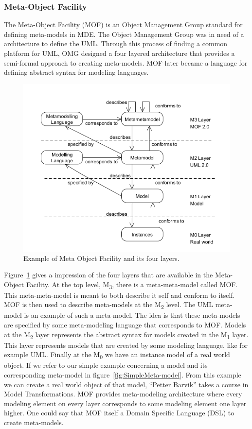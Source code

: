 \subsubsection*{Meta-Object Facility}

The Meta-Object Facility\cite{MOF} (MOF) is an Object Management Group standard
for defining meta-models in MDE. The Object Management Group was in need of a
architecture to define the UML. Through this process of finding a common
platform for UML, OMG designed a four layered architecture that provides a
semi-formal approach to creating meta-models. MOF later became a language for
defining abstract syntax for modeling languages. 

\begin{figure}[H]
	\centering
	\includegraphics[scale=0.6]{./Figures/MOFLayers.png}
	\caption[Meta Object Facility]
	{Example of Meta Object Facility and its four layers.}
	\label{fig:MOFLayers}
\end{figure}

Figure~\ref{fig:MOFLayers} gives a impression of the four layers that are
available in the Meta-Object Facility. At the top level, M\textsubscript{3},
there is a meta-meta-model called MOF. This meta-meta-model is meant to both
describe it self and conform to itself. MOF is then used to describe meta-models
at the M\textsubscript{2} level. The UML meta-model is an example of such a
meta-model. The idea is that these meta-models are specified by some
meta-modeling language that corresponds to MOF. Models at the M\textsubscript{2}
layer represents the abstract syntax for models created in the M\textsubscript{1} layer. This
layer represents models that are created by some modeling language, like
for example UML. Finally at the M\textsubscript{0} we have an instance model of
a real world object. If we refer to our simple example concerning a model and
its corresponding meta-model in figure~\ref{fig:SimpleMeta-model}. From this
example we can create a real world object of that model, ``Petter Barvik'' takes
a course in Model Transformations. MOF provides meta-modeling architecture where
every modeling element on every layer corresponds to some modeling element
one layer higher. One could say that MOF itself a Domain Specific Language (DSL)
to create meta-models. 
 
